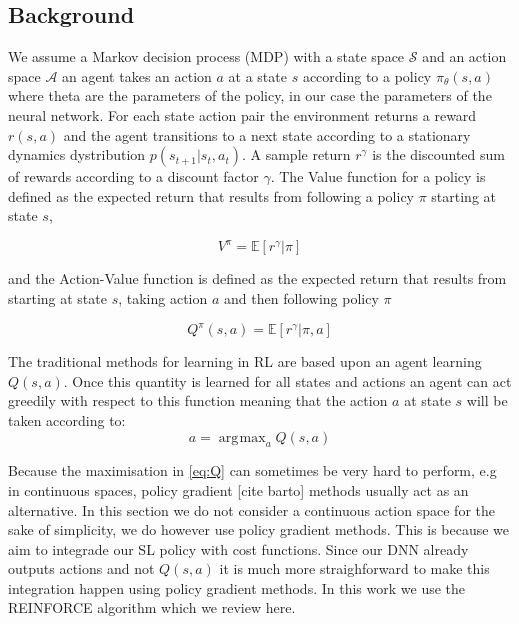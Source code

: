 \documentclass[a4paper,11pt]{report}
\DeclareMathOperator*{\argmax}{\arg\!\max}
\begin{document}
\subsection{Background}\label{sec:pg_background}

We assume a Markov decision process (MDP) with a state space $\mathcal{S}$ and an action space $\mathcal{A}$ an agent takes an action $a$ at a state $s$ according to a policy $\pi_\theta(s,a)$ where theta are the parameters of the policy, in our case the parameters of the neural network. For each state action pair the environment returns a reward $r(s,a)$ and the agent transitions to a next state according to a stationary dynamics dystribution $p(s_{t+1}|s_t,a_t)$. A sample return $r^{\gamma}$ is the discounted sum of rewards according to a discount factor $\gamma$. The Value function for a policy is defined as the expected return that results from following a policy $\pi$ starting at state $s$,


\begin{equation}
	V^{\pi} = \mathbb{E}[r^{\gamma}|\pi]
\end{equation}

and the Action-Value function is defined as the expected return that results from starting at state $s$, taking action $a$ and then following policy $\pi$

\begin{equation}
	Q^{\pi}(s,a) = \mathbb{E}[r^{\gamma}|\pi,a]
\end{equation}


The traditional methods for learning in RL are based upon an agent learning $Q(s,a)$. Once this quantity is learned for all states and actions an agent can act greedily with respect to this function meaning that the action $a$ at state $s$ will be taken according to:
\begin{equation}
	a = \argmax_a Q(s,a) \label{eq:Q}
\end{equation}

Because the maximisation in \ref{eq:Q} can sometimes be very hard to perform, e.g in continuous spaces, policy gradient [cite barto] methods usually act as an alternative. In this section we do not consider a continuous action space for the sake of simplicity, we do however use policy gradient methods. This is because we aim to integrade our SL policy with cost functions. Since our DNN already outputs actions and not $Q(s,a)$ it is much more straighforward to make this integration happen using policy gradient methods. In this work we use the REINFORCE algorithm \cite{williams1992simple} which we review here. 
\end{document}
